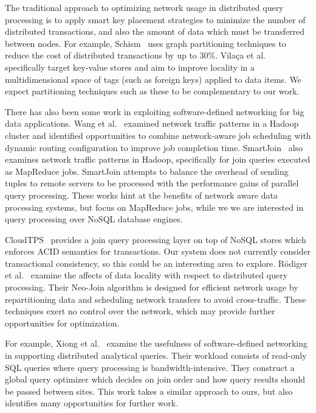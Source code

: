 \documentclass{sig-alternate-2013}
\begin{document}
The traditional approach to optimizing network usage in distributed query processing is to apply smart key placement strategies to minimize the number of distributed transactions, and also the amount of data which must be transferred between nodes.
For example, Schism~\cite{Curino2010} uses graph partitioning techniques to reduce the cost of distributed transactions by up to 30\%.
Vila\c{c}a et al.~\cite{Vilaca2011} specifically target key-value stores and aim to improve locality in a multidimensional space of tags (such as foreign keys) applied to data items.
We expect partitioning techniques such as these to be complementary to our work.

There has also been some work in exploiting software-defined networking for big data applications.
Wang et al.~\cite{Wang2012} examined network traffic patterns in a Hadoop~\cite{Shvachko2010} cluster and identified opportunities to combine network-aware job scheduling with dynamic routing configuration to improve job completion time.
SmartJoin~\cite{Slagter2014} also examines network traffic patterns in Hadoop, specifically for join queries executed as MapReduce jobs.
SmartJoin attempts to balance the overhead of sending tuples to remote servers to be processed with the performance gains of parallel query processing.
These works hint at the benefits of network aware data processing systems, but focus on MapReduce jobs, while we we are interested in query processing over NoSQL database engines.

CloudTPS~\cite{Wei2012} provides a join query processing layer on top of NoSQL stores which enforces ACID semantics for transactions.
Our system does not currently consider transactional consistency, so this could be an interesting area to explore.
R\"{o}diger et al.~\cite{Rodiger2014} examine the affects of data locality with respect to distributed query processing.
Their Neo-Join algorithm is designed for efficient network usage by repartitioning data and scheduling network transfers to avoid cross-traffic.
These techniques exert no control over the network, which may provide further opportunities for optimization.

For example, Xiong et al.~\cite{Xiong2014} examine the usefulness of software-defined networking in supporting distributed analytical queries.
Their workload consists of read-only SQL queries where query processing is bandwidth-intensive.
They construct a global query optimizer which decides on join order and how query results should be passed between sites.
This work takes a similar approach to ours, but also identifies many opportunities for further work.
\end{document}
